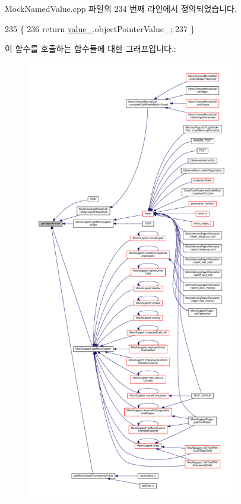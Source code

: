 Mock\+Named\+Value.\+cpp 파일의 234 번째 라인에서 정의되었습니다.


\begin{DoxyCode}
235 \{
236     \textcolor{keywordflow}{return} \hyperlink{class_mock_named_value_a68986aee29946116b59c6189c19733ac}{value\_}.objectPointerValue\_;
237 \}
\end{DoxyCode}


이 함수를 호출하는 함수들에 대한 그래프입니다.\+:
\nopagebreak
\begin{figure}[H]
\begin{center}
\leavevmode
\includegraphics[height=550pt]{class_mock_named_value_a4d4696a9a24da96598cfbe4865c23c66_icgraph}
\end{center}
\end{figure}


